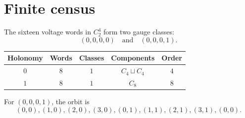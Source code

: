 \section{Finite census}

The sixteen voltage words in \(C_2^4\) form two gauge classes:
\[
(0,0,0,0)\quad\text{and}\quad(0,0,0,1).
\]

\begin{center}
\begin{tabular}{c|c|c|c|c}
Holonomy & Words & Classes & Components & Order\\
\hline
\(0\) & \(8\) & \(1\) & \(C_4\sqcup C_4\) & \(4\)\\
\(1\) & \(8\) & \(1\) & \(C_8\) & \(8\)
\end{tabular}
\end{center}

For \((0,0,0,1)\), the orbit is
\[
(0,0),(1,0),(2,0),(3,0),
(0,1),(1,1),(2,1),(3,1),(0,0).
\]
